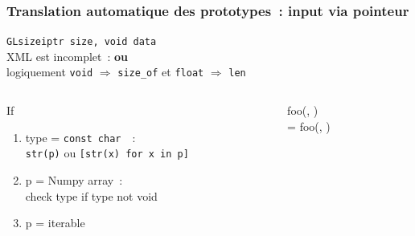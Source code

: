 \begin{frame}
  \frametitle{Translation automatique des prototypes~: input via pointeur}
  \texttt{GLsizeiptr size,  void  data} \\[.5em]
  \attention{} \alert{XML est incomplet~:  \textbf{ou} } \\
  logiquement \texttt{void} $\Longrightarrow$ \texttt{size\_of} et \texttt{float} $\Longrightarrow$ \texttt{len} \\[1em]
  \begin{columns}
    \begin{column}{.5\textwidth}
      If
      \begin{enumerate}
      \item type = \texttt{const char \ptr\ptr}~:\\
        \texttt{str(p)} ou \texttt{[str(x) for x in p]}
      \item p = Numpy array~:\\
        check type if type not void
      \item p = iterable
      \end{enumerate}
    \end{column}
    \begin{column}{.5\textwidth}
       foo(, ) \\
       = foo(, )
    \end{column}
  \end{columns}
  \note{
    \begin{enumerate}
    \item 
    \end{enumerate}
  }
\end{frame}

